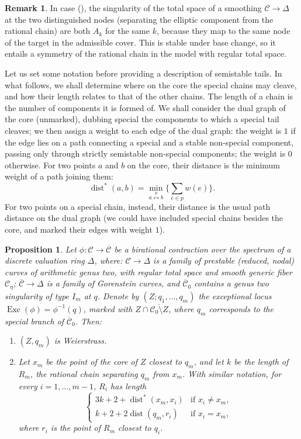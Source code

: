 \documentclass[11pt]{amsart}
\renewcommand{\to}{\rightarrow}
\newcommand{\dvr}{\Delta}
\newcommand{\dist}{\operatorname{dist}}
\newcommand{\Exc}{\operatorname{Exc}}
\theoremstyle{plain}
\newtheorem{prop}[thm]{Proposition}
\theoremstyle{definition}
\newtheorem{rem}[thm]{Remark}
\begin{document}
 \begin{rem}\label{rmk:necklace_symmetry}
  In case (\dag), the singularity of the total space of a smoothing $\mathcal C\to\dvr$ at the two distinguished nodes (separating the elliptic component from the rational chain) are both $A_k$ for the same $k$, because they map to the same node of the target in the admissible cover. This is stable under base change, so it entails a symmetry of the rational chain in the model with regular total space.
 \end{rem}

 Let us set some notation before providing a description of semistable tails. In what follows, we shall determine where on the core the special chains may cleave, and how their length relates to that of the other chains. The length of a chain is the number of components it is formed of. We shall consider the dual graph of the core (unmarked), dubbing special the components to which a special tail cleaves; we then assign a weight to each edge of the dual graph: the weight is $1$ if the edge lies on a path connecting a special and a stable non-special component, passing only through strictly semistable non-special components; the weight is $0$ otherwise. For two points $a$ and $b$ on the core, their distance is the minimum weight of a path joining them:\[\dist^*(a,b)=\min_{a\overset{p}\leftrightarrow b}\{\sum_{e\in p}w(e)\}.\]
 For two points on a special chain, instead, their distance is the usual path distance on the dual graph (we could have included special chains besides the core, and marked their edges with weight $1$).

\begin{prop}\label{prop:tailI}
 Let $\phi\colon\mathcal C\to\overline{\mathcal C}$ be a birational contraction over the spectrum of a discrete valuation ring $\dvr$, where: $\mathcal C\to \dvr$ is a family of prestable (reduced, nodal) curves of arithmetic genus two, with regular total space and smooth generic fiber $\mathcal C_{\eta}$; $\overline{\mathcal C}\to\dvr$ is a family of Gorenstein curves, and $\overline{\mathcal C}_0$ contains a genus two singularity of type $I_m$ at $q$. Denote by $(Z;q_1,\ldots,q_m)$ the exceptional locus $\Exc(\phi)=\phi^{-1}(q)$, marked with $Z\cap\overline{\mathcal C_0\setminus Z}$, where $q_m$ corresponds to the special branch of $\overline{\mathcal C}_0$. Then:
 \begin{enumerate}[leftmargin=.6cm]
  \item $(Z,q_m)$ is Weierstrass.
  \item Let $x_m$ be the point of the core of $Z$ closest to $q_m$, and let $k$ be the length of $R_m$, the rational chain separating $q_m$ from $x_m$. With similar notation, for every $i=1,\ldots,m-1$, $R_i$ has length 
  \begin{equation*}
  \begin{cases}
   3k+2+\dist^*(x_m,x_i) & \text{if } x_i\neq x_m,\\
   k+2+2\dist(q_m,r_i)  & \text{if } x_i=x_m,
  \end{cases} 
  \end{equation*}
 where $r_i$ is the point of $R_m$ closest to $q_i$.
 \end{enumerate}
\end{prop}
\end{document}
